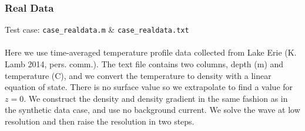 \documentclass[letterpaper]{article}
\begin{document}
\subsubsection{Real Data}
Test case: \verb"case_realdata.m" \&  \verb"case_realdata.txt" \\\\
Here we use time-averaged temperature profile data collected from Lake Erie (K. Lamb 2014, pers. comm.). 
The text file contains two columns, depth (m) and temperature (\textdegree C), and we convert the temperature to density with a linear equation of state.
There is no surface value so we extrapolate to find a value for $z=0$.
We construct the density and density gradient in the same fashion as in the synthetic data case, and use no background current.
We solve the wave at low resolution and then raise the resolution in two steps.



\end{document}
